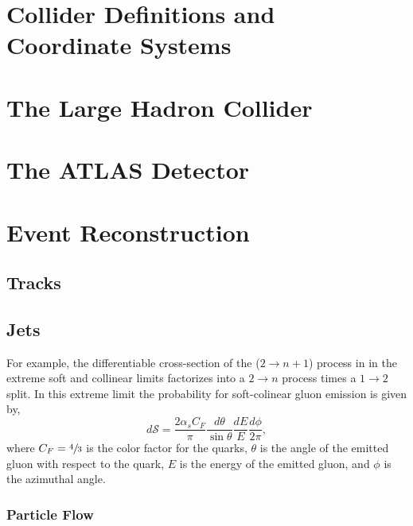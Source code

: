 
\section{Collider Definitions and Coordinate Systems}

\section{The Large Hadron Collider}

\section{The ATLAS Detector}

\section{Event Reconstruction}
\label{sec:event_reconstruction}

\subsection{Tracks}

\subsection{Jets}

For example, the differentiable cross-section of the ($2\rightarrow n+1$) process in  in the extreme soft and collinear limits factorizes into a $2 \rightarrow n$ process times a $1 \rightarrow 2$ split.
In this extreme limit the probability for soft-colinear gluon emission is given by,
\begin{equation}
	\label{eq:gluon_emission}
	d \mathcal{S} = \frac{2 \alpha_s C_F}{\pi} \frac{d \theta}{\sin\theta} \frac{dE}{E} \frac{d\phi}{2\pi},
\end{equation}
where $C_F = \sfrac{4}{3}$ is the color factor for the quarks, $\theta$ is the angle of the emitted gluon with respect to the quark, $E$ is the energy of the emitted gluon, and $\phi$ is the azimuthal angle.

\subsubsection{Particle Flow}
\label{sec:particle_flow}

